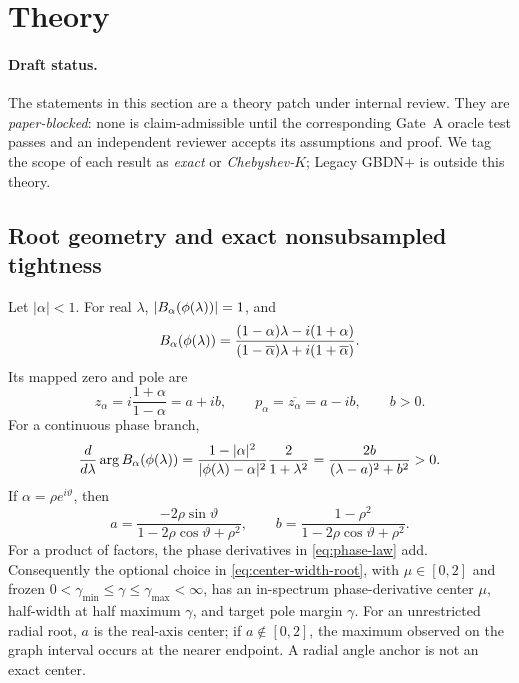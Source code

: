 \section{Theory}
\label{sec:theory}

\paragraph{Draft status.}
The statements in this section are a theory patch under internal review.  They
are \emph{paper-blocked}: none is claim-admissible until the corresponding
Gate~A oracle test passes and an independent reviewer accepts its assumptions
and proof.  We tag the scope of each result as \emph{exact} or
\emph{Chebyshev-$K$}; Legacy GBDN+ is outside this theory.

\subsection{Root geometry and exact nonsubsampled tightness}

\begin{proposition}
\label{prop:phase-pole}
Let $|\alpha|<1$.  For real $\lambda$,
$|B_\alpha(\phi(\lambda))|=1$, and
\begin{equation}
 B_\alpha(\phi(\lambda))
 =\frac{(1-\alpha)\lambda-i(1+\alpha)}
 {(1-\overline\alpha)\lambda+i(1+\overline\alpha)}.
 \label{eq:rational-form}
\end{equation}
Its mapped zero and pole are
\begin{equation}
 z_\alpha=i\frac{1+\alpha}{1-\alpha}=a+ib,
 \qquad
 p_\alpha=\overline{z_\alpha}=a-ib,
 \qquad b>0.
 \label{eq:mapped-zero-pole}
\end{equation}
For a continuous phase branch,
\begin{equation}
 \frac{d}{d\lambda}\arg B_\alpha(\phi(\lambda))
 =\frac{1-|\alpha|^2}{|\phi(\lambda)-\alpha|^2}
   \frac{2}{1+\lambda^2}
 =\frac{2b}{(\lambda-a)^2+b^2}>0.
 \label{eq:phase-law}
\end{equation}
If $\alpha=\rho e^{i\vartheta}$, then
\begin{equation}
 a=\frac{-2\rho\sin\vartheta}{1-2\rho\cos\vartheta+\rho^2},
 \qquad
 b=\frac{1-\rho^2}{1-2\rho\cos\vartheta+\rho^2}.
 \label{eq:radial-mapped-geometry}
\end{equation}
For a product of factors, the phase derivatives in \cref{eq:phase-law} add.
Consequently the optional choice in \cref{eq:center-width-root}, with
$\mu\in[0,2]$ and frozen
$0<\gamma_{\min}\leq\gamma\leq\gamma_{\max}<\infty$, has an in-spectrum
phase-derivative center $\mu$, half-width at half maximum $\gamma$, and target
pole margin $\gamma$.  For an unrestricted radial root, $a$ is the real-axis
center; if $a\notin[0,2]$, the maximum observed on the graph interval occurs
at the nearer endpoint.  A radial angle anchor is not an exact center.
\end{proposition}

